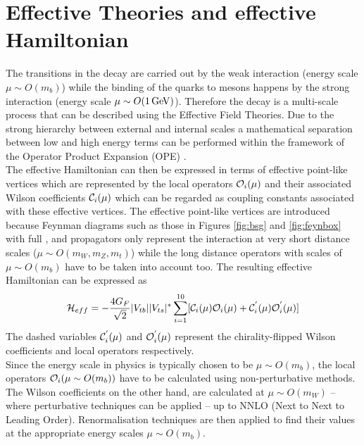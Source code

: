 \section{Effective Theories and effective Hamiltonian}
The transitions in the \BdKstll decay are carried out by the weak interaction (energy scale $\mu \sim O(m_b)$) while the binding of the quarks to mesons happens by the strong interaction (energy scale $\mu \sim O(1 \mathrm{\,Ge\kern -0.1em V} )$). Therefore the \BdKstll decay is a multi-scale process that can be described using the Effective Field Theories. Due to the strong hierarchy between external and internal scales a mathematical separation between low and high energy terms can be performed within the framework of the Operator Product Expansion (OPE) \cite{buras}.\\
The effective Hamiltonian can then be expressed in terms of effective point-like vertices which are represented by the local operators $\mathcal{O}_{i}(\mu)$  and their associated Wilson coefficients $\mathcal{C}_{i}(\mu)$ which can be regarded as coupling constants associated with these effective vertices.
The effective point-like vertices are introduced because Feynman diagrams such as those in Figures \ref{fig:bsg} and \ref{fig:feynbox} with full \W , \Z and \tquark propagators only represent the interaction at very short distance scales ($\mu \sim O(m_W, m_Z, m_t)$) while the long distance operators with scales of $\mu \sim O(m_b)$ have to be taken into account too. The resulting effective Hamiltonian can be expressed as
\vspace*{-0.3cm}
\begin{equation}
\mathcal{H}_{eff} = -\frac{4G_F}{\sqrt{2}}\Vtb \Vts^* \sum_{i=1}^{10} [\Ci(\mu)\Opei(\mu) + \Cpi(\mu)\Opepi(\mu)]\\
\vspace*{-0.4cm}
\label{eq:genhamilton}
\end{equation}
The dashed variables $\mathcal{C}_{i}^{'}(\mu)$ and $\mathcal{O}_{i}^{'}(\mu)$ represent the chirality-flipped Wilson coefficients and local operators respectively.\\
Since the energy scale in \B physics is typically chosen to be $\mu \sim O(m_b)$, the local operators $\mathcal{O}_{i}(\mu \sim O(m_b))$ have to be calculated using non-perturbative methods. The Wilson coefficients on the other hand, are calculated at $\mu \sim O(m_W)$ -- where perturbative techniques can be applied -- up to NNLO (Next to Next to Leading Order). Renormalisation techniques are then applied to find their values at the appropriate energy scales $\mu \sim O(m_b)$.\\

